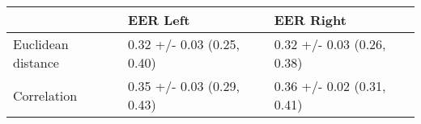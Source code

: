 \begin{tabular}{lll}
\toprule
{} &                    EER Left &                   EER Right \\
\midrule
Euclidean distance &  0.32 +/- 0.03 (0.25, 0.40) &  0.32 +/- 0.03 (0.26, 0.38) \\
Correlation        &  0.35 +/- 0.03 (0.29, 0.43) &  0.36 +/- 0.02 (0.31, 0.41) \\
\bottomrule
\end{tabular}
